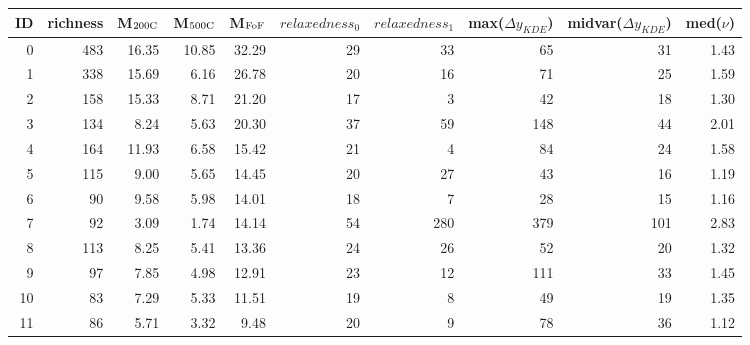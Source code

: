 \begin{tabular}{rrrrrrrrrr}
\toprule
ID & richness & M$_{\rm 200C}$ & M$_{\rm 500C}$ & M$_{\rm FoF}$ & $relaxedness_0$ & $relaxedness_1$ & max($\Delta y_{KDE}$) & midvar($\Delta y_{KDE}$) & med($\nu$) \\
\midrule
 0 &      483 &          16.35 &          10.85 &         32.29 &              29 &              33 &                    65 &                       31 &       1.43 \\
 1 &      338 &          15.69 &           6.16 &         26.78 &              20 &              16 &                    71 &                       25 &       1.59 \\
 2 &      158 &          15.33 &           8.71 &         21.20 &              17 &               3 &                    42 &                       18 &       1.30 \\
 3 &      134 &           8.24 &           5.63 &         20.30 &              37 &              59 &                   148 &                       44 &       2.01 \\
 4 &      164 &          11.93 &           6.58 &         15.42 &              21 &               4 &                    84 &                       24 &       1.58 \\
 5 &      115 &           9.00 &           5.65 &         14.45 &              20 &              27 &                    43 &                       16 &       1.19 \\
 6 &       90 &           9.58 &           5.98 &         14.01 &              18 &               7 &                    28 &                       15 &       1.16 \\
 7 &       92 &           3.09 &           1.74 &         14.14 &              54 &             280 &                   379 &                      101 &       2.83 \\
 8 &      113 &           8.25 &           5.41 &         13.36 &              24 &              26 &                    52 &                       20 &       1.32 \\
 9 &       97 &           7.85 &           4.98 &         12.91 &              23 &              12 &                   111 &                       33 &       1.45 \\
10 &       83 &           7.29 &           5.33 &         11.51 &              19 &               8 &                    49 &                       19 &       1.35 \\
11 &       86 &           5.71 &           3.32 &          9.48 &              20 &               9 &                    78 &                       36 &       1.12 \\

\end{tabular}
